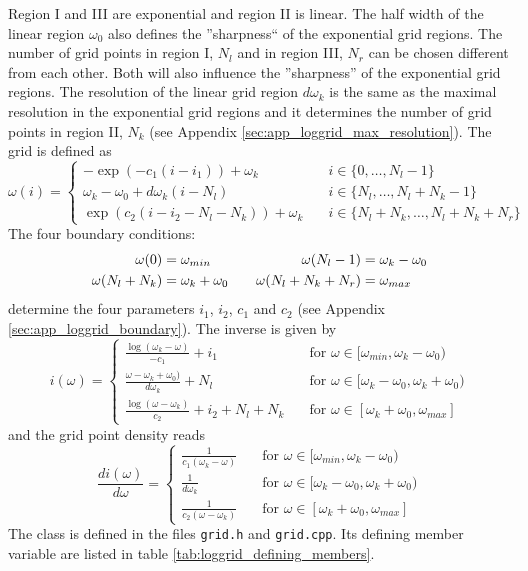 	Region I and III are exponential and region II is linear. The half width of the linear region $\omega_0$ also defines the ''sharpness`` of the exponential grid regions. The number of grid points in region I, $N_l$ and in region III, $N_r$ can be chosen different from each other. Both will also influence the ''sharpness'' of the exponential grid regions. The resolution of the linear grid region $d\omega_k$ is the same as the maximal resolution in the exponential grid regions and it determines the number of grid points in region II, $N_k$ (see Appendix \ref{sec:app_loggrid_max_resolution}). The grid is defined as
\begin{equation}\label{eqn:loggrid_definition}
	\omega(i)=\begin{cases}
		-\exp(-c_1(i-i_1)) + \omega_k 		\quad & i\in\{0,\dots,N_l-1\} \\ 
		\omega_k-\omega_0+d\omega_k(i-N_l)	\quad & i\in\{N_l,\dots,N_l+N_k-1\} \\ 
		\exp(c_2(i-i_2-N_l-N_k)) + \omega_k 	\quad & i\in\{N_l+N_k,\dots,N_l+N_k+N_r\}
	\end{cases}
\end{equation}
The four boundary conditions:
\begin{align}\label{eqn:loggrid_boundary_conditions}
	\omega(0)&=\omega_{min} \quad &\omega(N_l-1)&=\omega_k-\omega_0 \notag \\
	\omega(N_l+N_k)&=\omega_k+\omega_0 \quad &\omega(N_l+N_k+N_r)&=\omega_{max}
\end{align}
determine the four parameters $i_1$, $i_2$, $c_1$ and $c_2$ (see Appendix \ref{sec:app_loggrid_boundary}). The inverse is given by
\[
	i(\omega)=\begin{cases}
		\frac{\log(\omega_k-\omega)}{-c_1} + i_1 \quad &\text{for } \omega\in[\omega_{min},\omega_k-\omega_0) \\
		\frac{\omega-\omega_k+\omega_0)}{d\omega_k} + N_l \quad &\text{for } \omega\in[\omega_k-\omega_0,\omega_k+\omega_0) \\
		\frac{\log(\omega-\omega_k)}{c_2} + i_2 + N_l + N_k \quad &\text{for } \omega\in[\omega_k+\omega_0, \omega_{max}]
	\end{cases}
\]
and the grid point density reads
\[
	\frac{di(\omega)}{d\omega}=\begin{cases}
		\frac{1}{c_1(\omega_k-\omega)} \quad &\text{for } \omega\in[\omega_{min},\omega_k-\omega_0) \\
		\frac{1}{d\omega_k} \quad &\text{for } \omega\in[\omega_k-\omega_0,\omega_k+\omega_0) \\
		\frac{1}{c_2(\omega-\omega_k)}  \quad &\text{for } \omega\in[\omega_k+\omega_0, \omega_{max}]
	\end{cases}
\]
The class is defined in the files \texttt{grid.h} and \texttt{grid.cpp}. Its defining member variable are listed in table \ref{tab:loggrid_defining_members}.

